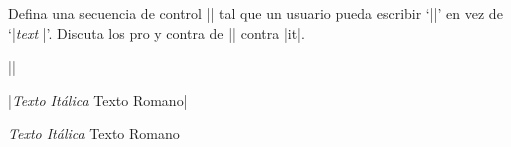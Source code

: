  


\bigskip

\enunciadoS Defina una secuencia de control |\ital| tal que un usuario pueda escribir `||' 
en vez de `|{\it text \/}|'. Discuta los pro y contra de |\ital| contra |it|.

\bigskip

\respuestaS |\def\ita#1{{\it#1\/}}|

\def\ita#1{{\it#1\/}}

|\ita{Texto It\'alica} Texto Romano|

\ita{Texto It\'alica} Texto Romano

\bye